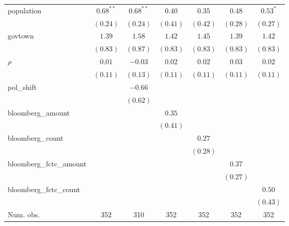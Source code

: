 \begin{table}[!h]
\begin{center}
\begin{tabular}{l c c c c c c }
population              & $0.68^{**}$  & $0.68^{**}$  & $0.40$       & $0.35$       & $0.48$       & $0.53^{*}$   \\
                        & $(0.24)$     & $(0.24)$     & $(0.41)$     & $(0.42)$     & $(0.28)$     & $(0.27)$     \\
govtown                 & $1.39$       & $1.58$       & $1.42$       & $1.45$       & $1.39$       & $1.42$       \\
                        & $(0.83)$     & $(0.87)$     & $(0.83)$     & $(0.83)$     & $(0.83)$     & $(0.83)$     \\
$\rho$                  & $0.01$       & $-0.03$      & $0.02$       & $0.02$       & $0.03$       & $0.02$       \\
                        & $(0.11)$     & $(0.13)$     & $(0.11)$     & $(0.11)$     & $(0.11)$     & $(0.11)$     \\
pol\_shift              &              & $-0.66$      &              &              &              &              \\
                        &              & $(0.62)$     &              &              &              &              \\
bloomberg\_amount       &              &              & $0.35$       &              &              &              \\
                        &              &              & $(0.41)$     &              &              &              \\
bloomberg\_count        &              &              &              & $0.27$       &              &              \\
                        &              &              &              & $(0.28)$     &              &              \\
bloomberg\_fctc\_amount &              &              &              &              & $0.37$       &              \\
                        &              &              &              &              & $(0.27)$     &              \\
bloomberg\_fctc\_count  &              &              &              &              &              & $0.50$       \\
                        &              &              &              &              &              & $(0.43)$     \\
\midrule
Num. obs.               & 352          & 310          & 352          & 352          & 352          & 352          \\

\end{tabular}
\end{center}
\end{table}
